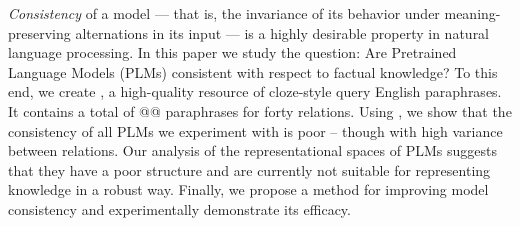 
\textit{Consistency} of a model --- that is, the invariance
of its behavior under meaning-preserving alternations in its
input --- is a highly desirable property in natural language
processing.  In this paper we study the question: Are
Pretrained Language Models (PLMs) consistent with respect to
factual knowledge?  To this end, we create \resource{}, a
high-quality resource of cloze-style query English
paraphrases. It contains a total of @@ paraphrases for forty
relations.  Using \resource{}, we show that the consistency
of all PLMs we experiment with is poor -- though with high
variance between relations.  Our analysis of the
representational spaces of PLMs suggests that they have a
poor structure and are currently not suitable for
representing knowledge in a robust way.  Finally, we propose
a method for improving model consistency and experimentally
demonstrate its efficacy.

